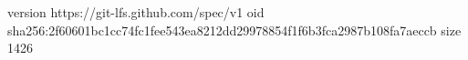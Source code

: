 version https://git-lfs.github.com/spec/v1
oid sha256:2f60601bc1cc74fc1fee543ea8212dd29978854f1f6b3fca2987b108fa7aeccb
size 1426
